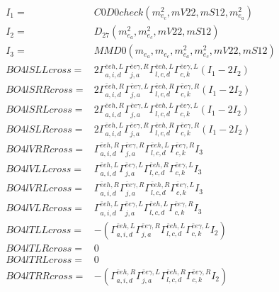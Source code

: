 \documentclass[A4,landscape]{article}
\begin{document}
\begin{align} 
I_1 = & C0D0check(m^2_{e_{{c}}}, mV22, mS12, m^2_{e_{{a}}}) \\ 
I_2 = & D_{27}(m^2_{e_{{a}}}, m^2_{e_{{c}}}, mV22, mS12) \\ 
I_3 = & MMD0(m_{e_{{a}}}, m_{e_{{c}}}, m^2_{e_{{a}}}, m^2_{e_{{c}}}, mV22, mS12) \\ 
  BO4lSLLcross= & 2  \Gamma^{\bar{e}e h ,L}_{a, i, d} \Gamma^{\bar{e}e \gamma ,R}_{j, a} \Gamma^{\bar{e}e h ,L}_{l, c, d} \Gamma^{\bar{e}e \gamma ,L}_{c, k} (I_1 - 2 I_2) \\ 
  BO4lSRRcross= & 2  \Gamma^{\bar{e}e h ,R}_{a, i, d} \Gamma^{\bar{e}e \gamma ,L}_{j, a} \Gamma^{\bar{e}e h ,R}_{l, c, d} \Gamma^{\bar{e}e \gamma ,R}_{c, k} (I_1 - 2 I_2) \\ 
  BO4lSRLcross= & 2  \Gamma^{\bar{e}e h ,R}_{a, i, d} \Gamma^{\bar{e}e \gamma ,L}_{j, a} \Gamma^{\bar{e}e h ,L}_{l, c, d} \Gamma^{\bar{e}e \gamma ,L}_{c, k} (I_1 - 2 I_2) \\ 
  BO4lSLRcross= & 2  \Gamma^{\bar{e}e h ,L}_{a, i, d} \Gamma^{\bar{e}e \gamma ,R}_{j, a} \Gamma^{\bar{e}e h ,R}_{l, c, d} \Gamma^{\bar{e}e \gamma ,R}_{c, k} (I_1 - 2 I_2) \\ 
  BO4lVRRcross= &  \Gamma^{\bar{e}e h ,R}_{a, i, d} \Gamma^{\bar{e}e \gamma ,R}_{j, a} \Gamma^{\bar{e}e h ,L}_{l, c, d} \Gamma^{\bar{e}e \gamma ,R}_{c, k} I_3 \\ 
  BO4lVLLcross= &  \Gamma^{\bar{e}e h ,L}_{a, i, d} \Gamma^{\bar{e}e \gamma ,L}_{j, a} \Gamma^{\bar{e}e h ,R}_{l, c, d} \Gamma^{\bar{e}e \gamma ,L}_{c, k} I_3 \\ 
  BO4lVRLcross= &  \Gamma^{\bar{e}e h ,R}_{a, i, d} \Gamma^{\bar{e}e \gamma ,R}_{j, a} \Gamma^{\bar{e}e h ,R}_{l, c, d} \Gamma^{\bar{e}e \gamma ,L}_{c, k} I_3 \\ 
  BO4lVLRcross= &  \Gamma^{\bar{e}e h ,L}_{a, i, d} \Gamma^{\bar{e}e \gamma ,L}_{j, a} \Gamma^{\bar{e}e h ,L}_{l, c, d} \Gamma^{\bar{e}e \gamma ,R}_{c, k} I_3 \\ 
  BO4lTLLcross= & -( \Gamma^{\bar{e}e h ,L}_{a, i, d} \Gamma^{\bar{e}e \gamma ,R}_{j, a} \Gamma^{\bar{e}e h ,L}_{l, c, d} \Gamma^{\bar{e}e \gamma ,L}_{c, k} I_2) \\ 
  BO4lTLRcross= & 0 \\ 
  BO4lTRLcross= & 0 \\ 
  BO4lTRRcross= & -( \Gamma^{\bar{e}e h ,R}_{a, i, d} \Gamma^{\bar{e}e \gamma ,L}_{j, a} \Gamma^{\bar{e}e h ,R}_{l, c, d} \Gamma^{\bar{e}e \gamma ,R}_{c, k} I_2) \\ 
\end{align} 
\end{document}
